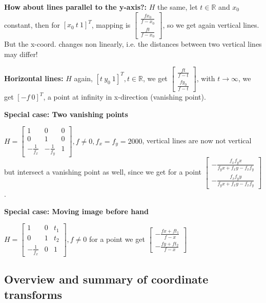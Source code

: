 \textbf{How about lines parallel to the y-axis?:} $H$ the same, let $t \in \mathbb{R}$ and $x_0$ constant, then for $[x_0 \ t \ 1]^T$, mapping is $\left[ \begin{matrix}\frac{fx_0}{f-x_0} \\ \frac{ft}{f-x_0}\end{matrix} \right]$, so we get again vertical lines. But the x-coord. changes non linearly, i.e. the distances between two vertical lines may differ!

\textbf{Horizontal lines:} $H$ again, $[t \ y_0 \ 1 ]^T, t \in \mathbb{R}$, we get $\left[ \begin{matrix}\frac{ft}{f-t} \\ \frac{fy_0}{f-t}\end{matrix} \right]$, with $t \rightarrow \infty$, we get $[-f \ 0]^T$, a point at infinity in x-direction (vanishing point).

\textbf{Special case: Two vanishing points}

$H = \left[\begin{matrix}
1 & 0 & 0 \\ 0 & 1 & 0 \\ -\frac{1}{f_x} & -\frac{1}{f_y} & 1 
\end{matrix}\right], f \neq 0, f_x = f_y = 2000$, vertical lines are now not vertical but intersect a vanishing point as  well, since we get for a point $\left[\begin{matrix}
-\frac{f_x f_y x}{f_y x + f_x y - f_x f_y} \\ -\frac{f_x f_y y}{f_y x + f_x y - f_x f_y}
\end{matrix}\right]$.

\textbf{Special case: Moving image before hand}

$H = \left[\begin{matrix}
1 & 0 & t_1 \\ 0 & 1 & t_2 \\ -\frac{1}{f_x} & 0 & 1 
\end{matrix}\right], f \neq 0$ for a point we get $\left[\begin{matrix}
-\frac{fx + ft_1}{f - x} \\ -\frac{fy + ft_2}{f-x}
\end{matrix}\right]$

\subsection{Overview and summary of coordinate transforms}

